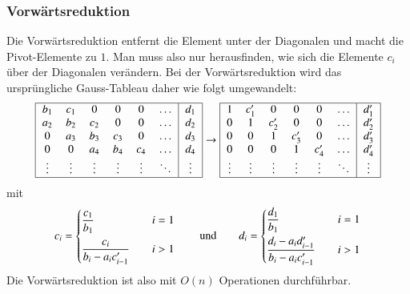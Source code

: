 \subsubsection{Vorwärtsreduktion}
Die Vorwärtsreduktion entfernt die Element unter der Diagonalen
und macht die Pivot-Elemente zu $1$.
Man muss also nur herausfinden, wie sich die Elemente $c_i$ über der
Diagonalen verändern.
Bei der Vorwärtsreduktion wird das ursprüngliche Gauss-Tableau daher
wie folgt umgewandelt:
\[
\begin{tabular}{|>{$}c<{$}>{$}c<{$}>{$}c<{$}>{$}c<{$}>{$}c<{$}>{$}c<{$}|>{$}c<{$}|}
\hline
b_1   & c_1  &  0   &  0   &  0   &\dots & d_1  \\
a_2   & b_2  & c_2  &  0   &  0   &\dots & d_2  \\
 0    & a_3  & b_3  & c_3  &  0   &\dots & d_3  \\
 0    &  0   & a_4  & b_4  & c_4  &\dots & d_4  \\
\vdots&\vdots&\vdots&\vdots&\vdots&\ddots&\vdots\\
\hline
\end{tabular}
\to
\begin{tabular}{|>{$}c<{$}>{$}c<{$}>{$}c<{$}>{$}c<{$}>{$}c<{$}>{$}c<{$}|>{$}c<{$}|}
\hline
 1    & c_1' &  0   &  0   &  0   &\dots & d_1' \\
 0    &  1   & c_2' &  0   &  0   &\dots & d_2' \\
 0    &  0   &  1   & c_3' &  0   &\dots & d_3' \\
 0    &  0   &  0   &  1   & c_4' &\dots & d_4' \\
\vdots&\vdots&\vdots&\vdots&\vdots&\ddots&\vdots\\
\hline
\end{tabular}
\]
mit
\begin{equation}
c_i
=
\begin{cases} 
\displaystyle \frac{c_1\mathstrut}{b_1\mathstrut}            &\quad i=1\\[8pt]
\displaystyle \frac{c_i\mathstrut}{b_i-a_ic'_{i-1}\mathstrut}&\quad i>1
\end{cases}
\qquad\text{und}\qquad
d_i
=
\begin{cases}
\displaystyle\frac{d_1\mathstrut}{b_1\mathstrut}                        &\quad i=1\\[8pt]
\displaystyle\frac{d_i-a_id'_{i-1}\mathstrut}{b_i-a_ic'_{i-1}\mathstrut}&\quad i>1
\end{cases}
\label{buch:equation:thomasvorwaerts}
\end{equation}
Die Vorwärtsreduktion ist also mit $O(n)$ Operationen durchführbar.

